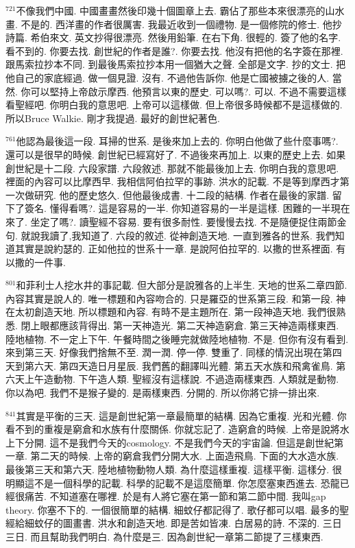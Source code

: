 \documentclass{book}
\begin{document}
$^{721}$不像我們中國.
中國畫畫然後印幾十個圖章上去.
霸佔了那些本來很漂亮的山水畫.
不是的.
西洋畫的作者很厲害.
我最近收到一個禮物.
是一個修院的修士.
他抄詩篇.
希伯來文.
英文抄得很漂亮.
然後用鉛筆.
在右下角.
很輕的.
簽了他的名字.
看不到的.
你要去找.
創世紀的作者是誰?.
你要去找.
他沒有把他的名字簽在那裡.
跟馬索拉抄本不同.
到最後馬索拉抄本用一個猶大之聲.
全部是文字.
抄的文士.
把他自己的家底經過.
做一個見證.
沒有.
不過他告訴你.
他是亡國被擄之後的人.
當然.
你可以堅持上帝啟示摩西.
他預言以東的歷史.
可以嗎?.
可以.
不過不需要這樣看聖經吧.
你明白我的意思吧.
上帝可以這樣做.
但上帝很多時候都不是這樣做的.
所以Bruce Walkie.
剛才我提過.
最好的創世紀著色.

$^{761}$他認為最後這一段.
耳掃的世系.
是後來加上去的.
你明白他做了些什麼事嗎?.
還可以是很早的時候.
創世紀已經寫好了.
不過後來再加上.
以東的歷史上去.
如果創世紀是十二段.
六段家譜.
六段敘述.
那就不能最後加上去.
你明白我的意思吧.
裡面的內容可以比摩西早.
我相信阿伯拉罕的事跡.
洪水的記載.
不是等到摩西才第一次做研究.
他的歷史悠久.
但他最後成書.
十二段的結構.
作者在最後的家譜.
留下了簽名.
懂得看嗎?.
這是容易的一半.
你知道容易的一半是這樣.
困難的一半現在來了.
坐定了嗎?.
讀聖經不容易.
要有很多耐性.
要慢慢去找.
不是隨便捉住兩節金句.
就說我讀了,我知道了.
六段的敘述.
從神創造天地.
一直到雅各的世系.
我們知道其實是說約瑟的.
正如他拉的世系十一章.
是說阿伯拉罕的.
以撒的世系裡面.
有以撒的一件事.

$^{801}$和菲利士人挖水井的事記載.
但大部分是說雅各的上半生.
天地的世系二章四節.
內容其實是說人的.
唯一標題和內容吻合的.
只是羅亞的世系第三段.
和第一段.
神在太初創造天地.
所以標題和內容.
有時不是主題所在.
第一段神造天地.
我們很熟悉.
閉上眼都應該背得出.
第一天神造光.
第二天神造窮倉.
第三天神造兩樣東西.
陸地植物.
不一定上下午.
午餐時間之後睡完就做陸地植物.
不是.
但你有沒有看到.
來到第三天.
好像我們捨無不至.
潤一潤.
停一停.
雙重了.
同樣的情況出現在第四天到第六天.
第四天造日月星辰.
我們舊的翻譯叫光體.
第五天水族和飛禽雀鳥.
第六天上午造動物.
下午造人類.
聖經沒有這樣說.
不過造兩樣東西.
人類就是動物.
你以為吧.
我們不是猴子變的.
是兩樣東西.
分開的.
所以你將它排一排出來.

$^{841}$其實是平衡的三天.
這是創世紀第一章最簡單的結構.
因為它重複.
光和光體.
你看不到的重複是窮倉和水族有什麼關係.
你就忘記了.
造窮倉的時候.
上帝是說將水上下分開.
這不是我們今天的cosmology.
不是我們今天的宇宙論.
但這是創世紀第一章.
第二天的時候.
上帝的窮倉我們分開大水.
上面造飛鳥.
下面的大水造水族.
最後第三天和第六天.
陸地植物動物人類.
為什麼這樣重複.
這樣平衡.
這樣分.
很明顯這不是一個科學的記載.
科學的記載不是這麼簡單.
你怎麼塞東西進去.
恐龍已經很痛苦.
不知道塞在哪裡.
於是有人將它塞在第一節和第二節中間.
我叫gap theory.
你塞不下的.
一個很簡單的結構.
細蚊仔都記得了.
歌仔都可以唱.
最多的聖經給細蚊仔的圖畫書.
洪水和創造天地.
即是苦如皆凍.
白居易的詩.
不深的.
三日三日.
而且幫助我們明白.
為什麼是三.
因為創世紀一章第二節提了三樣東西.
\end{document}
